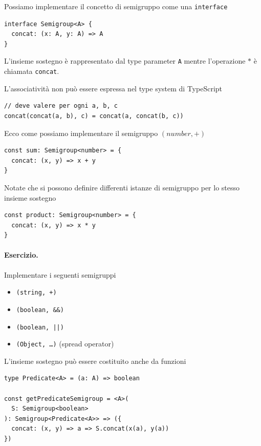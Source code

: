 \documentclass[12pt]{article}
\begin{document}
Possiamo implementare il concetto di semigruppo come una \texttt{interface}

\begin{verbatim}
interface Semigroup<A> {
  concat: (x: A, y: A) => A
}
\end{verbatim}

L'insieme sostegno è rappresentato dal type parameter \texttt{A} mentre l'operazione $*$ è chiamata \texttt{concat}.

L'associatività non può essere espressa nel type system di TypeScript

\begin{verbatim}
// deve valere per ogni a, b, c
concat(concat(a, b), c) = concat(a, concat(b, c))
\end{verbatim}

Ecco come possiamo implementare il semigruppo $(number, +)$

\begin{verbatim}
const sum: Semigroup<number> = {
  concat: (x, y) => x + y
}
\end{verbatim}

Notate che si possono definire differenti istanze di semigruppo per lo stesso insieme sostegno

\begin{verbatim}
const product: Semigroup<number> = {
  concat: (x, y) => x * y
}
\end{verbatim}

\paragraph{Esercizio.} Implementare i seguenti semigruppi
\begin{itemize}
  \item \texttt{(string, +)}
  \item \texttt{(boolean, \&\&)}
  \item \texttt{(boolean, ||)}
  \item \texttt{(Object, \ldots)} (spread operator)
\end{itemize}

L'insieme sostegno può essere costituito anche da funzioni

\begin{verbatim}
type Predicate<A> = (a: A) => boolean

const getPredicateSemigroup = <A>(
  S: Semigroup<boolean>
): Semigroup<Predicate<A>> => ({
  concat: (x, y) => a => S.concat(x(a), y(a))
})
\end{verbatim}
\end{document}
